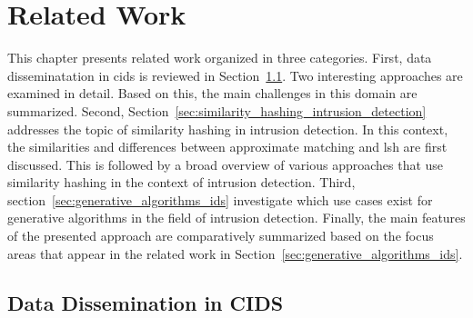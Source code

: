 \documentclass[../../main.tex]{subfiles}
\begin{document}
\chapter{Related Work}\label{ch:related_work}

This chapter presents related work organized in three categories. First, data disseminatation in \gls{cids} is reviewed in Section~\ref{sec:data_disseminatation_cids}. Two interesting approaches are examined in detail. Based on this, the main challenges in this domain are summarized. Second, Section~\ref{sec:similarity_hashing_intrusion_detection} addresses the topic of similarity hashing in intrusion detection. In this context, the similarities and differences between approximate matching and \gls{lsh} are first discussed. This is followed by a broad overview of various approaches that use similarity hashing in the context of intrusion detection. Third, section~\ref{sec:generative_algorithms_ids} investigate which use cases exist for generative algorithms in the field of intrusion detection. Finally, the main features of the presented approach are comparatively summarized based on the focus areas that appear in the related work in Section~\ref{sec:generative_algorithms_ids}.

\newpage
\section{Data Dissemination in CIDS}\label{sec:data_disseminatation_cids}
\end{document}
